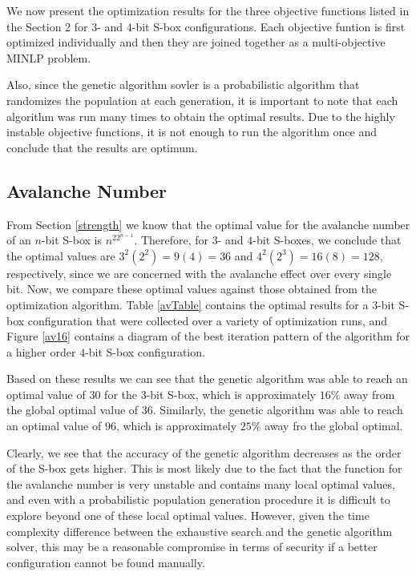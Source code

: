 \documentclass[11pt]{article}
\begin{document}
We now present the optimization results for the three objective functions listed in the Section 2 for $3$- and $4$-bit S-box configurations. Each objective funtion is first optimized individually and then they are joined together as a multi-objective MINLP problem. 

Also, since the genetic algorithm sovler is a probabilistic algorithm that randomizes the population at each generation, it is important to note that each algorithm was run many times to obtain the optimal results. Due to the highly instable objective functions, it is not enough to run the algorithm once and conclude that the results are optimum. 

\subsection{Avalanche Number}

From Section \ref{strength} we know that the optimal value for the avalanche number of an $n$-bit S-box is $n^22^{n-1}$. Therefore, for $3$- and $4$-bit S-boxes, we conclude that the optimal values are $3^2(2^2) = 9(4) = 36$ and $4^2(2^3) = 16(8) = 128$, respectively, since we are concerned with the avalanche effect over every single bit. Now, we compare these optimal values against those obtained from the optimization algorithm. Table \ref{avTable} contains the optimal results for a $3$-bit S-box configuration that were collected over a variety of optimization runs, and Figure \ref{av16} contains a diagram of the best iteration pattern of the algorithm for a higher order $4$-bit S-box configuration. 

Based on these results we can see that the genetic algorithm was able to reach an optimal value of $30$ for the $3$-bit S-box, which is approximately $16\%$ away from the global optimal value of $36$. Similarly, the genetic algorithm was able to reach an optimal value of $96$, which is approximately $25\%$ away fro the global optimal. 

Clearly, we see that the accuracy of the genetic algorithm decreases as the order of the S-box gets higher. This is most likely due to the fact that the function for the avalanche number is very unstable and contains many local optimal values, and even with a probabilistic population generation procedure it is difficult to explore beyond one of these local optimal values. However, given the time complexity difference between the exhaustive search and the genetic algorithm solver, this may be a reasonable compromise in terms of security if a better configuration cannot be found manually. 
\end{document}
